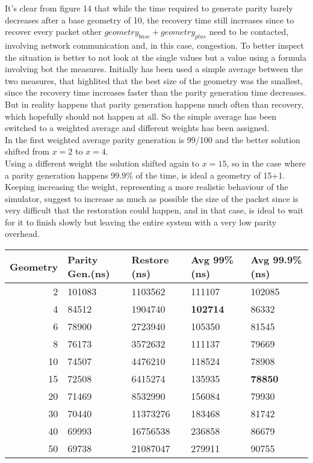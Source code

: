 It's clear from figure 14 that while the time required to generate parity barely
decreases after a base geometry of 10, the recovery time still increases since
to recover every packet other $geometry_{base} + geometry_{plus}$ need to be
contacted, involving network communication and, in this case, congestion.
To better inspect the situation is better to not look at the single values but a
value using a formula involving bot the measures. Initially has been used a
simple average between the two measures, that highlited that the best size of
the geometry was the smallest, since the recovery time increases faster than the
parity generation time decreases. \\
But in reality happens that parity generation happens much often than recovery,
which hopefully should not happen at all. So the simple average has been
switched to a weighted average and different weights has been assigned. \\
In the first weighted average parity generation is 99/100 and the better
solution shifted from $x=2$ to $x=4$. \\
Using a different weight the solution shifted again to $x=15$, so in the case
where a parity generation happens 99.9\% of the time, is ideal a geometry of
15+1.\\
Keeping increasing the weight, representing a more realistic behaviour of the
simulator, suggest to increase as much as possible the size of the packet since
is very difficult that the restoration could happen, and in that case, is ideal
to wait for it to finish slowly but leaving the entire system with a very low
parity overhead. \\

\begin{tabular}{r | l | l | l | l }
    Geometry & Parity Gen.(ns) & Restore (ns) & Avg 99\% (ns) & Avg 99.9\% (ns) \\\hline
    2 & 101083 & 1103562 & 111107 & 102085 \\
    4 & 84512 & 1904740 & \textbf{102714}& 86332 \\
    6 & 78900 & 2723940 & 105350 & 81545 \\
    8 & 76173 & 3572632 & 111137 & 79669 \\
    10 & 74507 & 4476210 & 118524 & 78908 \\
    15 & 72508 & 6415274 & 135935 & \textbf{78850} \\
    20 & 71469 & 8532990 & 156084 & 79930 \\
    30 & 70440 & 11373276 & 183468 & 81742 \\
    40 & 69993 & 16756538 & 236858 & 86679 \\
    50 & 69738 & 21087047 & 279911 & 90755 \\
\end{tabular} \\

